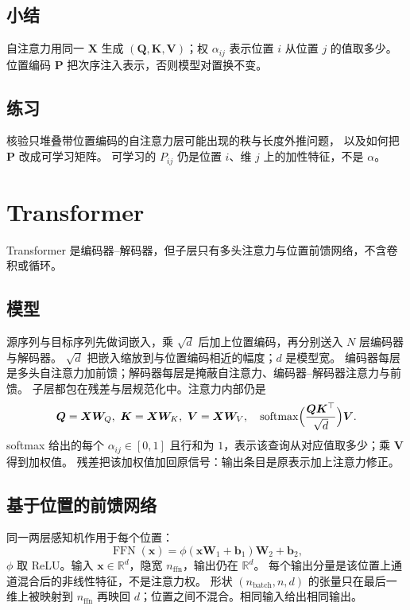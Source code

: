 \subsection{小结}

自注意力用同一 $\bm{X}$ 生成 $(\bm{Q},\bm{K},\bm{V})$；权 $\alpha_{ij}$ 表示位置 $i$ 从位置 $j$ 的值取多少。
位置编码 $\bm{P}$ 把次序注入表示，否则模型对置换不变。

\subsection{练习}

核验只堆叠带位置编码的自注意力层可能出现的秩与长度外推问题，
以及如何把 $\bm{P}$ 改成可学习矩阵。
可学习的 $P_{ij}$ 仍是位置 $i$、维 $j$ 上的加性特征，不是 $\alpha$。

\section{Transformer}



Transformer 是编码器--解码器，但子层只有多头注意力与位置前馈网络，不含卷积或循环。

\subsection{模型}

源序列与目标序列先做词嵌入，乘 $\sqrt{d}$ 后加上位置编码，再分别送入 $N$ 层编码器与解码器。
$\sqrt{d}$ 把嵌入缩放到与位置编码相近的幅度；$d$ 是模型宽。
编码器每层是多头自注意力加前馈；解码器每层是掩蔽自注意力、编码器--解码器注意力与前馈。
子层都包在残差与层规范化中。注意力内部仍是
\[
\bm{Q}=\bm{X}\bm{W}_{Q},\
\bm{K}=\bm{X}\bm{W}_{K},\
\bm{V}=\bm{X}\bm{W}_{V},
\quad
\operatorname{softmax}\Bigl(\frac{\bm{Q}\bm{K}^{\top}}{\sqrt{d}}\Bigr)\bm{V}.
\]
softmax 给出的每个 $\alpha_{ij}\in[0,1]$ 且行和为 $1$，表示该查询从对应值取多少；乘 $\bm{V}$ 得到加权值。
残差把该加权值加回原信号：输出条目是原表示加上注意力修正。

\subsection{基于位置的前馈网络}

同一两层感知机作用于每个位置：
\[
\operatorname{FFN}(\bm{x})
=
\phi(\bm{x}\bm{W}_1+\bm{b}_1)\bm{W}_2+\bm{b}_2,
\]
$\phi$ 取 ReLU。输入 $\bm{x}\in\mathbb{R}^{d}$，隐宽 $n_{\text{ffn}}$，输出仍在 $\mathbb{R}^{d}$。
每个输出分量是该位置上通道混合后的非线性特征，不是注意力权。
形状 $(n_{\text{batch}},n,d)$ 的张量只在最后一维上被映射到
$n_{\text{ffn}}$ 再映回 $d$；位置之间不混合。相同输入给出相同输出。

